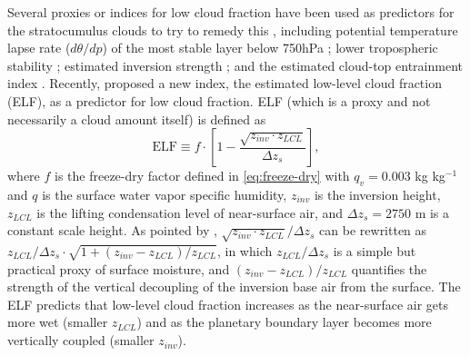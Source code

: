 Several proxies or indices for low cloud fraction have been used as predictors for the stratocumulus clouds to try to remedy this \citep[e.g.,][]{Kawai2006, Joshi2015, Collins2004, Guo2014, Kawai2019}, including potential temperature lapse rate ($d\theta/dp$) of the most stable layer below 750hPa \citep{Slingo1987}; lower tropospheric stability \citep[LTS;][]{Klein1993}; estimated inversion strength \citep[EIS;][]{Wood2006}; and the estimated cloud-top entrainment index \citep[ECTEI;][]{Kawai2017}. Recently, \citet{Park2019} proposed a new index, the estimated low-level cloud fraction (ELF), as a predictor for low cloud fraction. ELF (which is a proxy and not necessarily a cloud amount itself) is defined as
\begin{equation}
	\text{ELF} \equiv f \cdot\left[1-\frac{\sqrt{z_{inv} \cdot z_{LCL}}}{\Delta z_{s}}\right],
	\label{eq:ELF}
\end{equation}
where $f$ is the freeze-dry factor defined in \eqref{eq:freeze-dry} with $q_v=0.003$ kg kg$^{-1}$ and $q$ is the surface water vapor specific humidity,  $z_{inv}$ is the inversion height, $z_{LCL}$ is the lifting condensation level of near-surface air, and $\Delta z_{s}= 2750$ m is a constant scale height. As pointed by \citet{Park2019},
$\sqrt{z_{inv} \cdot z_{LCL}}/\Delta z_{s}$ can be rewritten as $z_{LCL}/\Delta z_{s}\cdot \sqrt{1+(z_{inv} -z_{LCL})/z_{LCL}}$, in which $z_{LCL}/\Delta z_{s}$ is a simple but practical proxy of surface moisture, and $(z_{inv}-z_{LCL})/z_{LCL}$ quantifies the strength of the vertical decoupling of the inversion base air from the surface. The ELF predicts that low-level cloud fraction increases as the near-surface air gets more wet (smaller $z_{LCL}$) and as the planetary boundary layer becomes more vertically coupled (smaller $z_{inv}$).

